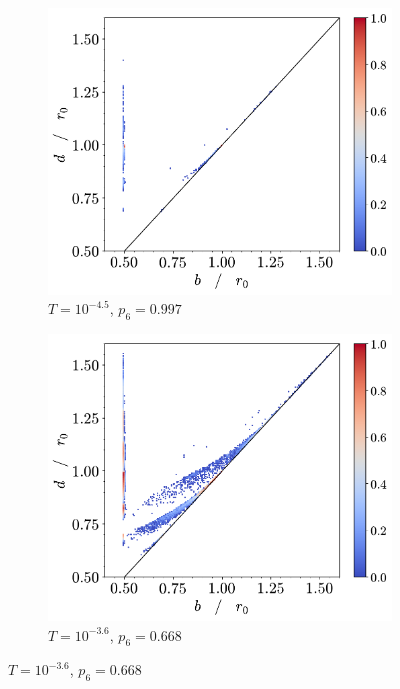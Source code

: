 \begin{figure}[tb]
	\centering
     
      \begin{subfigure}[b]{0.48\textwidth}
         \centering
         \includegraphics[width=\textwidth]{./figures/ph/t-4500_tr_pd.pdf}
         \caption{$T=10^{-4.5}$, $p_6=0.997$}
         \label{fig:trpda}
     \end{subfigure}
     \hfill
      \begin{subfigure}[b]{0.48\textwidth}
         \centering
         \includegraphics[width=\textwidth]{./figures/ph/t-3600_tr_pd.pdf}
         \caption{$T=10^{-3.6}$, $p_6=0.668$}
         \label{fig:trpdb}
     \end{subfigure}
     \hfill
     	

\end{figure}

